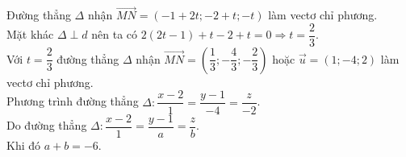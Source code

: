 \begin{ex}
{\begin{itemchoice}
			Đường thẳng $\Delta $ nhận $\overrightarrow{MN}  = (-1+2t;-2+t;-t)$ làm vectơ chỉ phương.\\
			Mặt khác $\Delta \perp d$ nên ta có $2(2t-1)+t-2+t=0 \Rightarrow  t = \dfrac{2}{3}$.\\
			Với $t = \dfrac{2}{3}$ đường thẳng $\Delta $  nhận $\overrightarrow{MN} = \left( \dfrac{1}{3}; -\dfrac{4}{3}; -\dfrac{2}{3}\right)$ hoặc $\overrightarrow{u} = (1;-4;2)$ làm vectơ chỉ phương.\\
			Phương trình  đường thẳng $\Delta \colon \dfrac{x-2}{1}= \dfrac{y-1}{-4} = \dfrac{z}{-2}$.\\
			Do đường thẳng $\Delta \colon \dfrac{x-2}{1}= \dfrac{y-1}{a}  = \dfrac{z}{b}$.\\
			 Khi đó $a+b=-6$.
		\end{itemchoice}
	 }
\end{ex}

